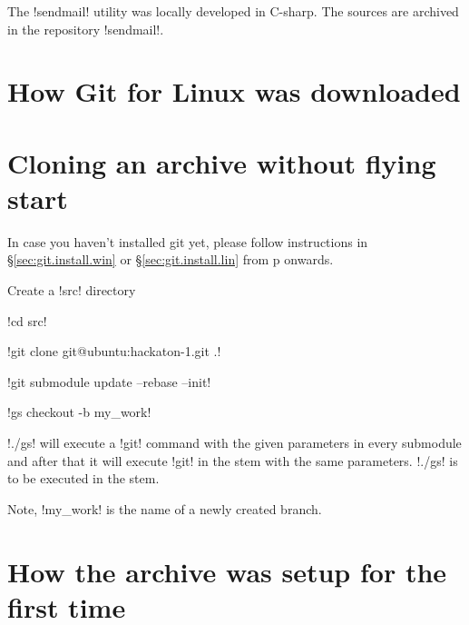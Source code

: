 \noindent
The !sendmail! utility was locally developed in C-sharp. The sources are
archived in the repository !sendmail!.

\section{How Git for Linux was downloaded }

\tbc

\section{Cloning an archive without flying start \label{sec:git.startnofly}}

In case you haven't installed git yet, please follow instructions in
\S\ref{sec:git.install.win} or \S\ref{sec:git.install.lin}
from p\pageref{sec:git.install.win} onwards.


\begin{enumerate*}
\item Create a !src! directory
\item !cd src!
\item !git clone git@ubuntu:hackaton-1.git .!
\item !git submodule update --rebase --init!
\item !gs checkout -b my_work!
\end{enumerate*}


\noindent
!./gs! will execute a !git! command with the given parameters in every
submodule and after that it will execute !git! in the stem with the same
parameters. !./gs! is to be executed in the stem.

\noindent
Note, !my_work! is the name of a newly created branch.

\section{How the archive was setup for the first time}

